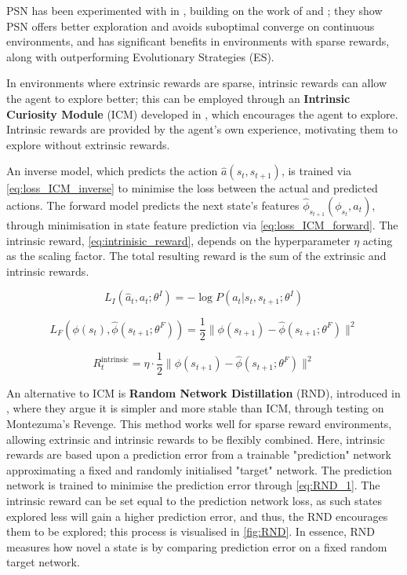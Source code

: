 PSN has been experimented with in \cite{plappert2018parameter}, building on the work of \cite{sehnke2010parameter} and \cite{rucksties2008state}; they show PSN offers better exploration and avoids suboptimal converge on continuous environments, and has significant benefits in environments with sparse rewards, along with outperforming Evolutionary Strategies (ES).


In environments where extrinsic rewards are sparse, intrinsic rewards can allow the agent to explore better; this can be employed through an \textbf{Intrinsic Curiosity Module} (ICM) developed in \cite{pathak2017curiosity}, which encourages the agent to explore. Intrinsic rewards are provided by the agent's own experience, motivating them to explore without extrinsic rewards.

An inverse model, which predicts the action \(\hat{a}(s_t, s_{t+1})\), is trained via \autoref{eq:loss_ICM_inverse} to minimise the loss between the actual and predicted actions. The forward model predicts the next state's features \(\hat{\phi}_{s_{t+1}}(\phi_{s_t}, a_t)\), through minimisation in state feature prediction via \autoref{eq:loss_ICM_forward}. The intrinsic reward, \autoref{eq:intrinisic_reward}, depends on the hyperparameter $\eta$ acting as the scaling factor. The total resulting reward is the sum of the extrinsic and intrinsic rewards.

\begin{equation}
    L_I(\hat{a}_t, a_t; \theta^I) = -\log P(a_t | s_t, s_{t+1}; \theta^I)
\label{eq:loss_ICM_inverse}
\end{equation}

\begin{equation}
    L_F(\phi(s_t), \hat{\phi}(s_{t+1}; \theta^F)) = \frac{1}{2} \|\phi(s_{t+1}) - \hat{\phi}(s_{t+1}; \theta^F)\|^2
\label{eq:loss_ICM_forward}
\end{equation}

\begin{equation}
    R^{\text{intrinsic}}_t = \eta \cdot \frac{1}{2} \|\phi(s_{t+1}) - \hat{\phi}(s_{t+1}; \theta^F)\|^2
\label{eq:intrinisic_reward}
\end{equation}

An alternative to ICM is \textbf{Random Network Distillation} (RND), introduced in \cite{burda2018exploration}, where they argue it is simpler and more stable than ICM, through testing on Montezuma's Revenge. This method works well for sparse reward environments, allowing extrinsic and intrinsic rewards to be flexibly combined. Here, intrinsic rewards are based upon a prediction error from a trainable "prediction" network approximating a fixed and randomly initialised "target" network. The prediction network is trained to minimise the prediction error through \autoref{eq:RND_1}. The intrinsic reward can be set equal to the prediction network loss, as such states explored less will gain a higher prediction error, and thus, the RND encourages them to be explored; this process is visualised in \autoref{fig:RND}. In essence, RND measures how novel a state is by comparing prediction error on a fixed random target network.

